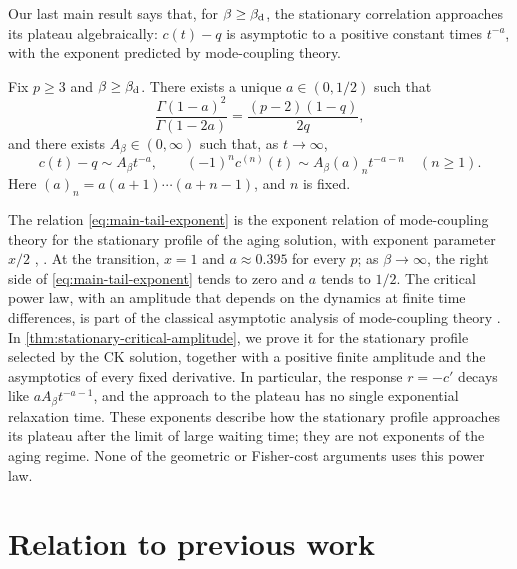 Our last main result says that, for $\beta\ge\beta_{\mathrm d}$, the stationary correlation approaches its plateau algebraically: $c(t)-q$ is asymptotic to a positive constant times $t^{-a}$, with the exponent predicted by mode-coupling theory.

\begin{theorem}\label{thm:main-stationary-tail}
Fix $p\ge3$ and $\beta\ge\beta_{\mathrm d}$. There exists a unique $a\in(0,1/2)$ such that
\begin{equation}
 \frac{\Gamma(1-a)^2}{\Gamma(1-2a)}=\frac{(p-2)(1-q)}{2q},
 \label{eq:main-tail-exponent}
\end{equation}
and there exists $A_\beta\in(0,\infty)$ such that, as $t\to\infty$,
\begin{equation}
 c(t)-q\sim A_\beta t^{-a},\qquad
 (-1)^nc^{(n)}(t)\sim A_\beta(a)_nt^{-a-n}\quad(n\ge1).
 \label{eq:main-stationary-tail}
\end{equation}
Here $(a)_n=a(a+1)\cdots(a+n-1)$, and $n$ is fixed.
\end{theorem}

The relation \eqref{eq:main-tail-exponent} is the exponent relation of mode-coupling theory for the stationary profile of the aging solution, with exponent parameter $x/2$ \cite[arXiv version, Equation~(IV.6)]{bckm1996}, \cite{kimlatz2001}. At the transition, $x=1$ and $a\approx0.395$ for every $p$; as $\beta\to\infty$, the right side of \eqref{eq:main-tail-exponent} tends to zero and $a$ tends to $1/2$. The critical power law, with an amplitude that depends on the dynamics at finite time differences, is part of the classical asymptotic analysis of mode-coupling theory \cite[Section~4, Equation~(6), pp.~880--881]{goetze1998}. In \cref{thm:stationary-critical-amplitude}, we prove it for the stationary profile selected by the CK solution, together with a positive finite amplitude and the asymptotics of every fixed derivative. In particular, the response $r=-c'$ decays like $aA_\beta t^{-a-1}$, and the approach to the plateau has no single exponential relaxation time. These exponents describe how the stationary profile approaches its plateau after the limit of large waiting time; they are not exponents of the aging regime. None of the geometric or Fisher-cost arguments uses this power law.

\section{Relation to previous work}\label{sec:intro-related}

